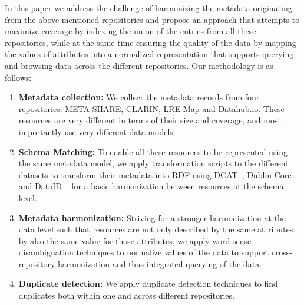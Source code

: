 \documentclass[11pt]{article}
\begin{document}
In this paper we address the challenge of harmonizing the metadata originating from the above mentioned repositories and propose an approach that attempts to maximize coverage by indexing the union of the entries from all these repositories, while at the same time ensuring the quality of the data by mapping the values of attributes into a normalized representation that supports querying and browsing data across the different repositories. Our methodology is as follows:

\begin{enumerate}
\item \textbf{Metadata collection:} We collect the metadata records from four repositories: META-SHARE, CLARIN, LRE-Map and Datahub.io. These resources are very
different in terms of their size and coverage, and most importantly use very
different data models.
\item \textbf{Schema Matching:} To enable all these resources to be represented using the same metadata
model, we apply transformation scripts to the different datasets to transform their metadata into RDF using DCAT~\cite{maali2014data}, Dublin Core~\cite{weibel1998dublin} and DataID ~\cite{brummer2014dataid} for a basic harmonization between resources at the schema level. 
\item \textbf{Metadata harmonization:} Striving for a stronger harmonization at
    the data level such that resources are not only described by the same
    attributes by also the same value for those attributes, we apply word sense
    disambiguation techniques to normalize values of the data to support
    cross-repository harmonization and thus integrated querying of the data.%
\item \textbf{Duplicate detection:} We apply duplicate detection techniques to find duplicates both within one and across different repositories.
\end{enumerate}

\end{document}
